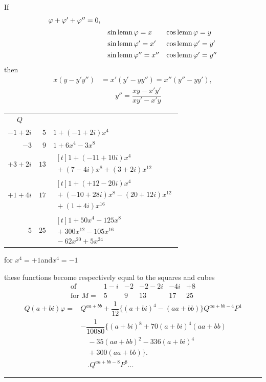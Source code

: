 If
\[
\begin{array}{rll}
\varphi+\varphi'+\varphi''=0,\\[5pt]&\operatorname{sin\,lemn}\varphi=x&\operatorname{cos\,lemn}\varphi=y\\[4pt]
&\operatorname{sin\,lemn}\varphi'=x'&\operatorname{cos\,lemn}\varphi'=y'\\[4pt]
&\operatorname{sin\,lemn}\varphi''=x''&\operatorname{cos\,lemn}\varphi'=y''
\end{array}
\]
then
\[
\begin{aligned}x(y-y'y'')&=x'(y'-yy'')=x''(y''-yy'),\\[7pt]&\qquad
y''=\dfrac{xy-x'y'}{xy'-x'y}\end{aligned}
\]
\begin{center}
\small
\begin{tabular}{r|r|l}
\multicolumn{1}{c}{$Q$}&\multicolumn{1}{c}{}&\multicolumn{1}{c}{}\\
$-1+2i$&$5$&$1+(-1+2i)x^4$\\[9pt]
$-3$&$9$&$1+6x^4-3x^8$\\[9pt]
$+3+2i$&$13$&$\begin{aligned}[t]1+(-11+10i)x^4\\[3pt]{}+(7-4i)x^8+(3+2i)x^{12}\end{aligned}$\\[9pt]
$+1+4i$&$17$&$\begin{aligned}[t]1+(+12-20i)x^4\\[3pt]{}+(-10+28i)x^8-(20+12i)x^{12}\\[3pt]{}+(1+4i)x^{16}\end{aligned}$\\[9pt]
$5$&$25$&$\begin{aligned}[t]1+50x^4-125x^8\\[3pt]{}+300x^{12}-105x^{16}\\[3pt]{}-62x^{20}+5x^{24}\end{aligned}$
\end{tabular}
\end{center}

for \hfill $x^4=+1$\quad and\quad $x^4=-1$\hfill\mbox{}

these functions become respectively equal to the squares and cubes
\[
\begin{array}{rccccc}
\text{of}&1-i&-2&-2-2i&-4i&+8\\
\text{for }M=&5&9&13&17&25
\end{array}
\]
\[
\begin{aligned}
Q(a+bi)\varphi={}&Q^{aa+bb}+\dfrac1{12}\{(a+bi)^4-(aa+bb)\}Q^{aa+bb-4}P^4\\[7pt]
&-\dfrac1{10080}\{(a+bi)^8+70(a+bi)^4(aa+bb)\\[5pt]&\quad{}-35(aa+bb)^2-336(a+bi)^4\\[5pt]&\quad{}+300(aa+bb)\}.\\[7pt]
&\quad.Q^{aa+bb-8}P^8\mathord{.}\mathord{.}\mathord{.}
\end{aligned}
\]
\par\begin{center}\rule{.22\linewidth}{.3pt}\end{center}
\clearpage
\endgroup
